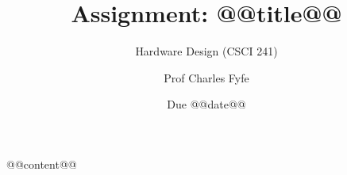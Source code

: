 \documentclass{scrartcl}
\title{Assignment: @@title@@}
\subtitle{Hardware Design (CSCI 241)}
\author{Prof Charles Fyfe}
\date{Due @@date@@}
\begin{document}
\maketitle

@@content@@
\end{document}
